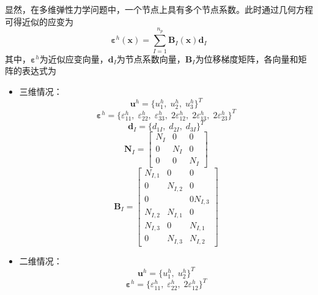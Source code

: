 显然，在多维弹性力学问题中，一个节点上具有多个节点系数。此时通过几何方程可得近似的应变为
\begin{equation}\label{ch_fem:epsilonh}
\boldsymbol \varepsilon^h(\boldsymbol x) = \sum_{I=1}^{n_p} \boldsymbol B_I(\boldsymbol x) \boldsymbol d_I
\end{equation}
其中，$\boldsymbol \varepsilon^h$为近似应变向量，$\boldsymbol d_I$为节点系数向量，$\boldsymbol B_I$为位移梯度矩阵，各向量和矩阵的表达式为
\begin{itemize}
    \item 三维情况：
\begin{equation}
\boldsymbol u^h = \{u_1^h,\;u_2^h,\;u_3^h\}^T
\end{equation}
\begin{equation}
\boldsymbol \varepsilon^h = \{\varepsilon^h_{11},\;\varepsilon^h_{22},\;\varepsilon^h_{33},\;2\varepsilon^h_{12},\;2\varepsilon^h_{13},\;2\varepsilon^h_{23}\}^T
\end{equation}
\begin{equation}
\boldsymbol d_I = \{d_{1I},\; d_{2I},\; d_{3I}\}^T
\end{equation}
\begin{equation}
\boldsymbol N_I = 
\begin{bmatrix}
        N_I & 0 & 0 \\
        0 & N_I & 0 \\
        0 & 0 & N_I
\end{bmatrix}
\end{equation}
\begin{equation}
\boldsymbol B_I = 
\begin{bmatrix}
        N_{I,1} & 0 & 0 \\
        0 & N_{I,2} & 0 \\
        0 & & 0 N_{I,3} \\
        N_{I,2} & N_{I,1} & 0 \\
        N_{I,3} & 0 & N_{I,1} \\
        0 & N_{I,3} & N_{I,2}
\end{bmatrix}
\end{equation}
    \item 二维情况：
\begin{equation}
\boldsymbol u^h = \{u_1^h,\;u_2^h\}^T
\end{equation}
\begin{equation}
\boldsymbol \varepsilon^h = \{\varepsilon^h_{11},\;\varepsilon^h_{22},\;2\varepsilon^h_{12}\}^T
\end{equation}

\end{itemize}
